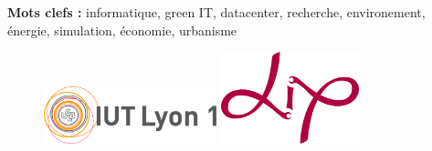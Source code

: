 \begin{spacing}{1}
	\textbf{Mots clefs :} informatique, green IT, datacenter, recherche, environement, énergie, simulation, économie, urbanisme

	\begin{figure}[b]
		\begin{minipage}[c]{.48\linewidth}
			\center
			\includegraphics[width=5cm]{pagedegarde/images/logo_iut.png}
		\end{minipage} \hfill
		\begin{minipage}[c]{.48\linewidth}
			\center
			\includegraphics[width=4cm]{pagedegarde/images/logo_lip.png}
		\end{minipage}
	\end{figure}
\end{spacing}